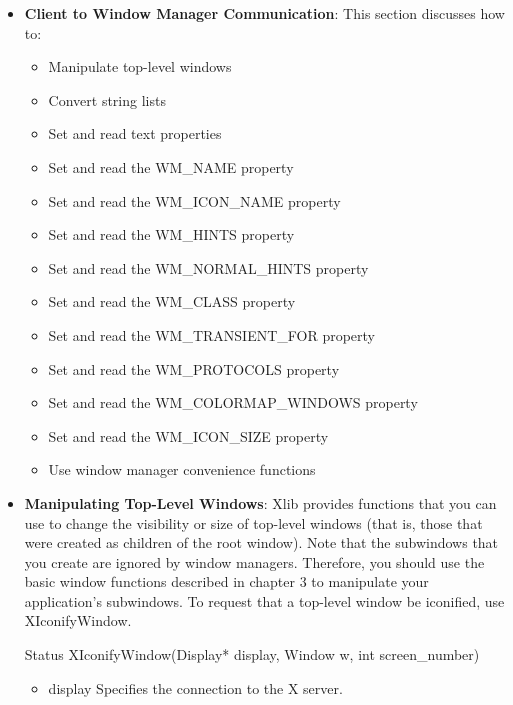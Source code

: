 \documentclass{report}
\begin{document}
\begin{itemize}
\begin{itemize}
\begin{center}
            \end{center}
        \item \textbf{Client to Window Manager Communication}: This section discusses how to:
            \begin{itemize}
                \item Manipulate top-level windows
                \item Convert string lists
                \item Set and read text properties
                \item Set and read the WM\_NAME property
                \item Set and read the WM\_ICON\_NAME property
                \item Set and read the WM\_HINTS property
                \item Set and read the WM\_NORMAL\_HINTS property
                \item Set and read the WM\_CLASS property
                \item Set and read the WM\_TRANSIENT\_FOR property
                \item Set and read the WM\_PROTOCOLS property
                \item Set and read the WM\_COLORMAP\_WINDOWS property
                \item Set and read the WM\_ICON\_SIZE property
                \item Use window manager convenience functions
            \end{itemize}
        \item \textbf{Manipulating Top-Level Windows}: Xlib provides functions that you can use to change the visibility or size of top-level windows (that is, those that were created as children of the root window). Note that the subwindows that you create are ignored by window managers. Therefore, you should use the basic window functions described in chapter 3 to manipulate your application’s subwindows.
            \bigbreak \noindent 
            To request that a top-level window be iconified, use XIconifyWindow.
            \bigbreak \noindent 
            \begin{cppcode}
                Status XIconifyWindow(Display* display, Window w, int screen_number)
            \end{cppcode}
            \begin{itemize}
                \item display Specifies the connection to the X server.

\end{itemize}
\end{itemize}
\end{itemize}
\end{document}
